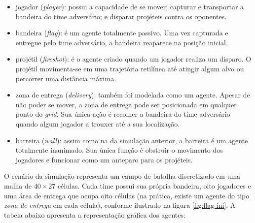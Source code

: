\documentclass[preprint,12pt]{elsarticle}
\begin{document}
\begin{itemize}
	\setlength\itemsep{0pt}
	\item jogador (\textit{player}): possui a capacidade de se mover; capturar e transportar a bandeira do time adversário; e disparar projéteis contra os oponentes.
	\item bandeira (\textit{flag}): é um agente totalmente passivo. Uma vez capturada e entregue pelo time adversário, a bandeira reaparece na posição inicial.
	\item projétil (\textit{fireshot}): é o agente criado quando um jogador realiza um disparo. O projétil movimenta-se em uma trajetória retilínea até atingir algum alvo ou percorrer uma distância máxima. 
	\item zona de entrega (\textit{delivery}): também foi modelada como um agente. Apesar de não poder se mover, a zona de entrega pode ser posicionada em qualquer ponto do \textit{grid}. Sua única ação é recolher a bandeira do time adversário quando algum jogador a trouxer até a sua localização.
	\item barreira (\textit{wall}): assim como na da simulação anterior, a barreira é um agente totalmente inanimado. Sua única função é obstruir o movimento dos jogadores e funcionar como um anteparo para os projéteis.
\end{itemize}

O cenário da simulação representa um campo de batalha discretizado em uma malha de $40 \times 27$ células. Cada time possui sua própria bandeira, oito jogadores e uma área de entrega que ocupa oito células (na prática, existe um agente do tipo \textit{zona de entrega} em cada célula), conforme ilustrado na figura \ref{fig:flag-ini}. A tabela abaixo apresenta a representação gráfica dos agentes:
\end{document}

